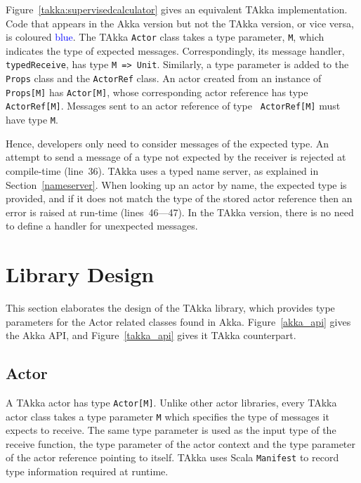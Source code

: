 Figure~\ref{takka:supervisedcalculator} gives an equivalent TAkka 
implementation. Code that appears in the Akka version but not the TAkka
version, or vice versa, is coloured \textcolor{blue}{blue}.  The 
TAkka {\tt Actor} class takes a type parameter, 
{\tt M}, which indicates the type of expected messages.  Correspondingly, its 
message handler, {\tt typedReceive}, has type
{\tt M => Unit}.
Similarly, a type parameter is added to the {\tt Props} 
class and the {\tt ActorRef} class.  An actor created from an instance of 
{\tt Props[M]} has {\tt Actor[M]}, whose corresponding actor reference 
has type {\tt ActorRef[M]}.  Messages sent to an actor reference of type {\tt 
ActorRef[M]} must have type {\tt M}.

Hence, developers only need to consider messages of the expected
type. An attempt to send a message of a type not expected by the
receiver is rejected at compile-time (line~36).  TAkka uses a typed
name server, as explained in Section~\ref{nameserver}.  When looking
up an actor by name, the expected type is provided, and if it does not
match the type of the stored actor reference then an error is raised
at run-time (lines~46---47).  In the TAkka version, there is no need to
define a handler for unexpected messages.

\section{Library Design}
\label{takka_design}

This section elaborates the design of the TAkka library, which provides type 
parameters for the Actor related classes found in Akka.  Figure~\ref{akka_api}
gives the Akka API, and Figure~\ref{takka_api} gives it TAkka counterpart.

\subsection{Actor}

A TAkka actor has type {\tt Actor[M]}.  Unlike other actor 
libraries, every TAkka actor class takes a type parameter {\tt M} which 
specifies the type of messages it expects to receive.  The same type parameter 
is used as the input type of the receive function, the type parameter of the 
actor context and the type parameter of the actor reference pointing to itself. 
TAkka uses Scala {\tt Manifest} to record type information required at runtime.

